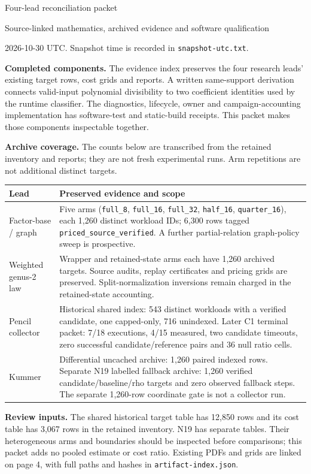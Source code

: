 \documentclass[11pt]{article}
\begin{document}
{\LARGE Four-lead reconciliation packet}\par
{\large Source-linked mathematics, archived evidence and software qualification}\par
2026-10-30 UTC. Snapshot time is recorded in \texttt{snapshot-utc.txt}.

\textbf{Completed components.} The evidence index preserves the four research leads' existing target rows, cost grids and reports. A written same-support derivation connects valid-input polynomial divisibility to two coefficient identities used by the runtime classifier. The diagnostics, lifecycle, owner and campaign-accounting implementation has software-test and static-build receipts. This packet makes those components inspectable together.

\textbf{Archive coverage.} The counts below are transcribed from the retained inventory and reports; they are not fresh experimental runs. Arm repetitions are not additional distinct targets.

\begin{tabularx}{\textwidth}{@{}p{}X@{}}\toprule
Lead & Preserved evidence and scope\\\midrule
Factor-base / graph & Five arms (\texttt{full\_8}, \texttt{full\_16}, \texttt{full\_32}, \texttt{half\_16}, \texttt{quarter\_16}), each 1,260 distinct workload IDs; 6,300 rows tagged \texttt{priced\_source\_verified}. A further partial-relation graph-policy sweep is prospective.\\
Weighted genus-2 law & Wrapper and retained-state arms each have 1,260 archived targets. Source audits, replay certificates and pricing grids are preserved. Split-normalization inversions remain charged in the retained-state accounting.\\
Pencil collector & Historical shared index: 543 distinct workloads with a verified candidate, one capped-only, 716 unindexed. Later C1 terminal packet: 7/18 executions, 4/15 measured, two candidate timeouts, zero successful candidate/reference pairs and 36 null ratio cells.\\
Kummer & Differential uncached archive: 1,260 paired indexed rows. Separate N19 labelled fallback archive: 1,260 verified candidate/baseline/rho targets and zero observed fallback steps. The separate 1,260-row coordinate gate is not a collector run.\\\bottomrule
\end{tabularx}

\textbf{Review inputs.} The shared historical target table has 12,850 rows and its cost table has 3,067 rows in the retained inventory. N19 has separate tables. Their heterogeneous arms and boundaries should be inspected before comparisons; this packet adds no pooled estimate or cost ratio. Existing PDFs and grids are linked on page 4, with full paths and hashes in \texttt{artifact-index.json}.
\end{document}
